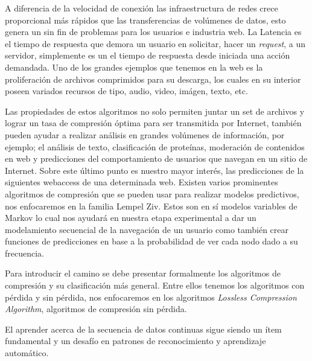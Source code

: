 A diferencia de la velocidad de conexión las infraestructura de redes crece proporcional más rápidos que las transferencias de volúmenes de datos, esto genera un sin fin de problemas para los usuarios e industria web. La Latencia  es el tiempo de respuesta que demora un usuario en solicitar, hacer un \emph{request}, a un servidor, simplemente es un el tiempo de respuesta desde iniciada una acción demandada. 
Uno de los grandes ejemplos que tenemos en la web es la proliferación de archivos comprimidos para su descarga, los cuales en su interior poseen variados recursos de tipo, audio, video, imágen, texto, etc.

Las propiedades de estos algoritmos no solo permiten juntar un set de archivos y lograr un tasa de compresión óptima para ser transmitida por Internet, también pueden ayudar a realizar análisis en grandes volúmenes de información, por ejemplo; el análisis de texto, clasificación de proteínas, moderación de contenidos en web y predicciones del comportamiento de usuarios que navegan en un sitio de Internet. Sobre este último punto es nuestro mayor interés, las predicciones de la siguientes webaccess de una determinada web. Existen varios prominentes algoritmos de compresión que se pueden usar para realizar modelos predictivos, nos enfocaremos en la familia Lempel Ziv. Estos son en sí modelos variables de Markov lo cual nos ayudará en nuestra etapa experimental a dar un modelamiento secuencial de la navegación de un usuario como también crear funciones de predicciones en base a la probabilidad de ver cada nodo dado a su frecuencia.

Para introducir el camino se debe presentar formalmente los algoritmos de compresión y su clasificación más general. Entre ellos tenemos los algoritmos con pérdida y sin pérdida, nos enfocaremos en los algoritmos \emph{Lossless Compression Algorithm}, algoritmos de compresión sin pérdida.


El aprender acerca de la secuencia de datos continuas sigue siendo un ítem fundamental y un desafío en patrones de reconocimiento y aprendizaje automático.





